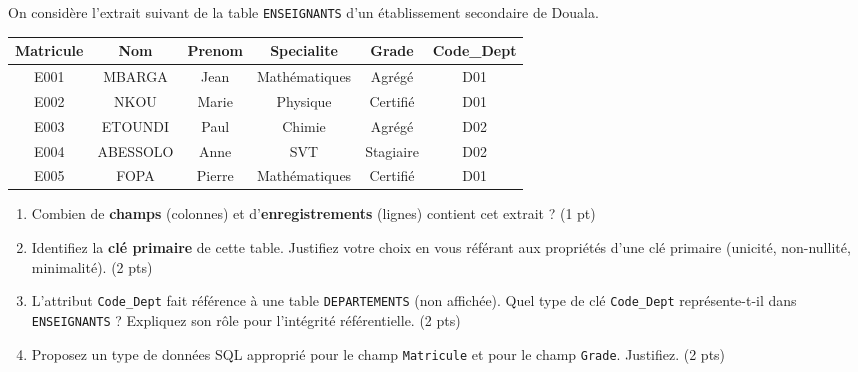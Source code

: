 \documentclass[11pt]{article}
\begin{document}
\begin{exercice}
On considère l'extrait suivant de la table \texttt{ENSEIGNANTS} d'un établissement secondaire de Douala.

\begin{center}
\begin{tabular}{|c|c|c|c|c|c|}
\hline
\textbf{Matricule} & \textbf{Nom} & \textbf{Prenom} & \textbf{Specialite} & \textbf{Grade} & \textbf{Code\_Dept} \\
\hline
E001 & MBARGA & Jean & Mathématiques & Agrégé & D01 \\
E002 & NKOU & Marie & Physique & Certifié & D01 \\
E003 & ETOUNDI & Paul & Chimie & Agrégé & D02 \\
E004 & ABESSOLO & Anne & SVT & Stagiaire & D02 \\
E005 & FOPA & Pierre & Mathématiques & Certifié & D01 \\
\hline
\end{tabular}
\end{center}

\begin{enumerate}
    \item Combien de \textbf{champs} (colonnes) et d'\textbf{enregistrements} (lignes) contient cet extrait ? (1 pt)
    \item Identifiez la \textbf{clé primaire} de cette table. Justifiez votre choix en vous référant aux propriétés d'une clé primaire (unicité, non-nullité, minimalité). (2 pts)
    \item L'attribut \texttt{Code\_Dept} fait référence à une table \texttt{DEPARTEMENTS} (non affichée). Quel type de clé \texttt{Code\_Dept} représente-t-il dans \texttt{ENSEIGNANTS} ? Expliquez son rôle pour l'intégrité référentielle. (2 pts)
    \item Proposez un type de données SQL approprié pour le champ \texttt{Matricule} et pour le champ \texttt{Grade}. Justifiez. (2 pts)
\end{enumerate}
\end{exercice}
\end{document}
